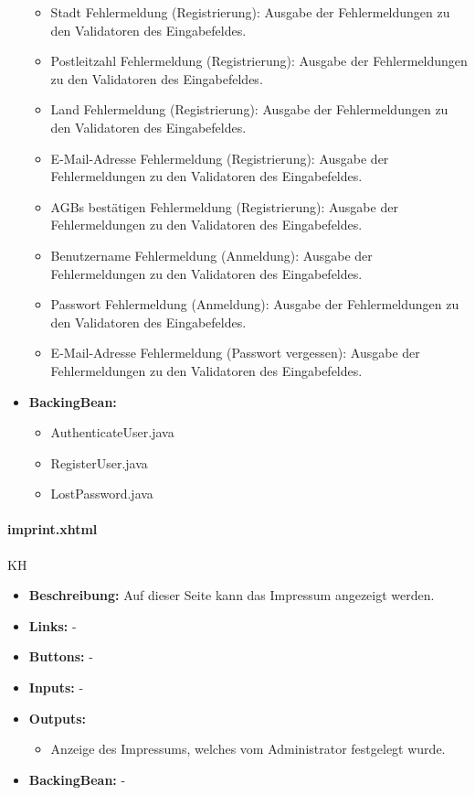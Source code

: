 \begin{itemize}
\begin{itemize}
							\item Stadt Fehlermeldung (Registrierung): Ausgabe der Fehlermeldungen zu den Validatoren des Eingabefeldes.
							\item Postleitzahl Fehlermeldung (Registrierung): Ausgabe der Fehlermeldungen zu den Validatoren des Eingabefeldes.
							\item Land Fehlermeldung (Registrierung): Ausgabe der Fehlermeldungen zu den Validatoren des Eingabefeldes.
							\item E-Mail-Adresse Fehlermeldung (Registrierung): Ausgabe der Fehlermeldungen zu den Validatoren des Eingabefeldes.
							\item AGBs bestätigen Fehlermeldung (Registrierung): Ausgabe der Fehlermeldungen zu den Validatoren des Eingabefeldes.
							\item Benutzername Fehlermeldung (Anmeldung): Ausgabe der Fehlermeldungen zu den Validatoren des Eingabefeldes.
							\item Passwort Fehlermeldung (Anmeldung): Ausgabe der Fehlermeldungen zu den Validatoren des Eingabefeldes.
							\item E-Mail-Adresse Fehlermeldung (Passwort vergessen): Ausgabe der Fehlermeldungen zu den Validatoren des Eingabefeldes.
						\end{itemize}
					\item \textbf{BackingBean:}
						\begin{itemize}
							\item AuthenticateUser.java
							\item RegisterUser.java
							\item LostPassword.java
						\end{itemize}
				\end{itemize}
				
				\paragraph{imprint.xhtml}
					KH\\
					\begin{itemize}
						\item \textbf{Beschreibung:} Auf dieser Seite kann das Impressum angezeigt werden.
						\item \textbf{Links:} -
						\item \textbf{Buttons:} -
						\item \textbf{Inputs:} -
						\item \textbf{Outputs:} 
							\begin{itemize}
								\item	Anzeige des Impressums, welches vom Administrator festgelegt wurde.
							\end{itemize}
						\item \textbf{BackingBean:} -
					\end{itemize}
				
